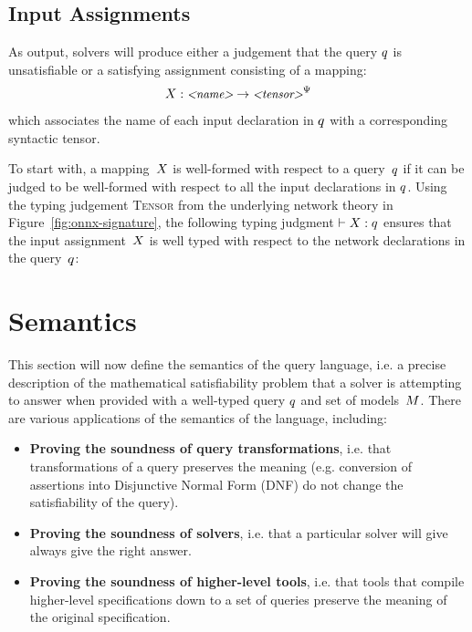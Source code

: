 \subsection{Input Assignments}
\label{sec:input-assignment-typing}

As output, solvers will produce either a judgement that the query $q$ is unsatisfiable or a satisfying assignment consisting of a mapping:
\begin{equation*}
X : \text{\small \textit{<name>}} \rightarrow \text{\small \textit{<tensor>}}^\Psi
\end{equation*}  
which associates the name of each input declaration in $q$ with a corresponding syntactic tensor. 

To start with, a mapping~$X$ is well-formed with respect to a query~$q$ if it can be judged to be well-formed with respect to all the input declarations in $q$. 
\unskip
Using the typing judgement \textsc{Tensor} from the underlying network theory in Figure~\ref{fig:onnx-signature}, the following typing judgment $\vdash X : q$ ensures that the input assignment~$X$ is well typed with respect to the network declarations in the query~$q$:
\unskip

\section{Semantics}
\label{sec:semantics}

This section will now define the semantics of the \vnnlib{} query language, i.e. a precise description of the mathematical satisfiability problem that a solver is attempting to answer when provided with a well-typed query $q$ and set of models~$M$.
There are various applications of the semantics of the language, including:
\begin{itemize}
\item \textbf{Proving the soundness of query transformations}, i.e. that transformations of a query preserves the meaning (e.g. conversion of assertions into Disjunctive Normal Form (DNF) do not change the satisfiability of the query). 
\item \textbf{Proving the soundness of solvers}, i.e. that a particular solver will give always give the right answer.
\item \textbf{Proving the soundness of higher-level tools}, i.e. that tools that compile higher-level specifications down to a set of \vnnlib{} queries preserve the meaning of the original specification.
\end{itemize}

